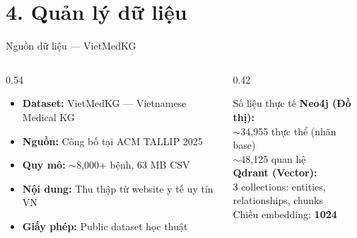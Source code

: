 \documentclass[aspectratio=169, 11pt]{beamer}
\begin{document}
\section{4. Quản lý dữ liệu}

\begin{frame}{Nguồn dữ liệu --- VietMedKG}
  \begin{columns}[t]
    \begin{column}{0.54\textwidth}
      \begin{itemize}
        \item \textbf{Dataset:} VietMedKG --- Vietnamese Medical KG
        \item \textbf{Nguồn:} Công bố tại ACM TALLIP 2025
        \item \textbf{Quy mô:} $\sim$8,000+ bệnh, 63 MB CSV
        \item \textbf{Nội dung:} Thu thập từ website y tế uy tín VN
        \item \textbf{Giấy phép:} Public dataset học thuật
      \end{itemize}
    \end{column}
    \begin{column}{0.42\textwidth}
      \begin{block}{Số liệu thực tế}
        \textbf{Neo4j (Đồ thị):}\\
        $\sim$34,955 thực thể (nhãn base)\\
        $\sim$48,125 quan hệ\\[4pt]
        \textbf{Qdrant (Vector):}\\
        3 collections: entities,\\
        relationships, chunks\\
        Chiều embedding: \textbf{1024}
      \end{block}
    \end{column}
  \end{columns}
\end{frame}
\end{document}
